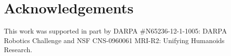 \documentclass[letterpaper, 10 pt, conference]{IEEEtran}
\begin{document}
\section{Acknowledgements}
This work was supported in part by DARPA \#N65236-12-1-1005: DARPA Robotics Challenge and NSF CNS-0960061 MRI-R2: Unifying Humanoids Research.



\end{document}
